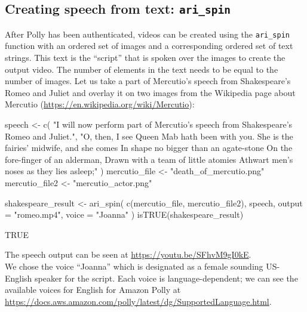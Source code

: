 \hypertarget{creating-speech-from-text-ari_spin}{%
\subsection{\texorpdfstring{Creating speech from text:
\texttt{ari\_spin}}{Creating speech from text: ari\_spin}}\label{creating-speech-from-text-ari_spin}}

After Polly has been authenticated, videos can be created using the
\texttt{ari\_spin} function with an ordered set of images and a
corresponding ordered set of text strings. This text is the ``script''
that is spoken over the images to create the output video. The number of
elements in the text needs to be equal to the number of images. Let us
take a part of Mercutio's speech from Shakespeare's Romeo and Juliet
\citep{shakespeare2003romeo} and overlay it on two images from the
Wikipedia page about Mercutio
(\url{https://en.wikipedia.org/wiki/Mercutio}):

\begin{Schunk}
\begin{Sinput}
speech <- c(
  "I will now perform part of Mercutio's speech from Shakespeare's Romeo and Juliet.",
  "O, then, I see Queen Mab hath been with you.
   She is the fairies' midwife, and she comes
   In shape no bigger than an agate-stone
   On the fore-finger of an alderman,
   Drawn with a team of little atomies
   Athwart men's noses as they lies asleep;"
)
mercutio_file <- "death_of_mercutio.png"
mercutio_file2 <- "mercutio_actor.png"
\end{Sinput}
\end{Schunk}

\begin{Schunk}
\begin{Sinput}
shakespeare_result <- ari_spin(
  c(mercutio_file, mercutio_file2),
  speech,
  output = "romeo.mp4", voice = "Joanna"
)
isTRUE(shakespeare_result)
\end{Sinput}
\end{Schunk}

\begin{Schunk}
\begin{Soutput}
[1] TRUE
\end{Soutput}
\end{Schunk}

The speech output can be seen at \url{https://youtu.be/SFhvM9gI0kE}.\\
We chose the voice ``Joanna'' which is designated as a female sounding
US-English speaker for the script. Each voice is language-dependent; we
can see the available voices for English for Amazon Polly at
\url{https://docs.aws.amazon.com/polly/latest/dg/SupportedLanguage.html}.

